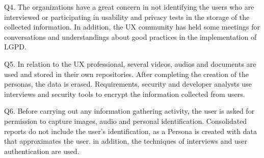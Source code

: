 \documentclass[conference]{IEEEtran}
\begin{document}

Q4. The organizations have a great concern in not identifying the users who are interviewed or participating in usability and privacy tests in the storage of the collected information. In addition, the UX community has held some meetings for conversations and understandings about good practices in the implementation of LGPD.


Q5. In relation to the UX professional, several videos, audios and documents are used and stored in their own repositories. After completing the creation of the personas, the data is erased. Requirements, security and developer analysts use interviews and security tools to encrypt the information collected from users.


Q6. Before carrying out any information gathering activity, the user is asked for permission to capture images, audio and personal identification. Consolidated reports do not include the user's identification, as a Persona is created with data that approximates the user. in addition, the techniques of interviews and user authentication are used.

\end{document}
